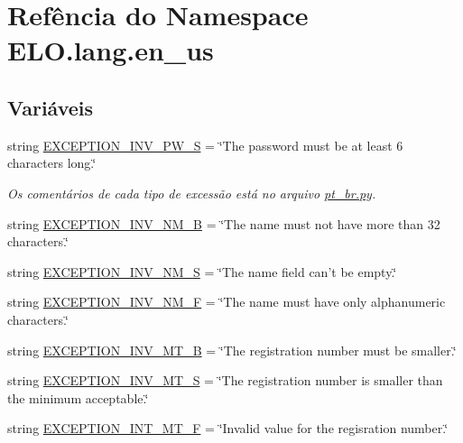 \hypertarget{namespaceELO_1_1lang_1_1en__us}{\section{Refência do Namespace E\-L\-O.\-lang.\-en\-\_\-us}
\label{dd/d09/namespaceELO_1_1lang_1_1en__us}
}
\subsection*{Variáveis}
\begin{DoxyCompactItemize}
\item 
string \hyperlink{namespaceELO_1_1lang_1_1en__us_a1b23e43e3041caedae9ed318310bee4b}{E\-X\-C\-E\-P\-T\-I\-O\-N\-\_\-\-I\-N\-V\-\_\-\-P\-W\-\_\-\-S} = \char`\"{}The password must be at least 6 characters long.\char`\"{}
\begin{DoxyCompactList}\small\item\em Os comentários de cada tipo de excessão está no arquivo \hyperlink{pt__br_8py}{pt\-\_\-br.\-py}. \end{DoxyCompactList}\item 
string \hyperlink{namespaceELO_1_1lang_1_1en__us_aae2f1bf3bb4c6868696250dbed355ab5}{E\-X\-C\-E\-P\-T\-I\-O\-N\-\_\-\-I\-N\-V\-\_\-\-N\-M\-\_\-\-B} = \char`\"{}The name must not have more than 32 characters.\char`\"{}
\item 
string \hyperlink{namespaceELO_1_1lang_1_1en__us_ad6bbf7d5f9ef9ec082ce65a8927c41fa}{E\-X\-C\-E\-P\-T\-I\-O\-N\-\_\-\-I\-N\-V\-\_\-\-N\-M\-\_\-\-S} = \char`\"{}The name field can't be empty.\char`\"{}
\item 
string \hyperlink{namespaceELO_1_1lang_1_1en__us_a9b6f04fee4448ac3e4f42e74577916e4}{E\-X\-C\-E\-P\-T\-I\-O\-N\-\_\-\-I\-N\-V\-\_\-\-N\-M\-\_\-\-F} = \char`\"{}The name must have only alphanumeric characters.\char`\"{}
\item 
string \hyperlink{namespaceELO_1_1lang_1_1en__us_abb981e0361d3f8c47c58eb5dba02f404}{E\-X\-C\-E\-P\-T\-I\-O\-N\-\_\-\-I\-N\-V\-\_\-\-M\-T\-\_\-\-B} = \char`\"{}The registration number must be smaller.\char`\"{}
\item 
string \hyperlink{namespaceELO_1_1lang_1_1en__us_a9fe5600755f36bfd095461d12f393a5b}{E\-X\-C\-E\-P\-T\-I\-O\-N\-\_\-\-I\-N\-V\-\_\-\-M\-T\-\_\-\-S} = \char`\"{}The registration number is smaller than the minimum acceptable.\char`\"{}
\item 
string \hyperlink{namespaceELO_1_1lang_1_1en__us_a4e3d0e163abf8bb4e4f446750f9b790d}{E\-X\-C\-E\-P\-T\-I\-O\-N\-\_\-\-I\-N\-T\-\_\-\-M\-T\-\_\-\-F} = \char`\"{}Invalid value for the regisration number.\char`\"{}

\end{DoxyCompactItemize}
